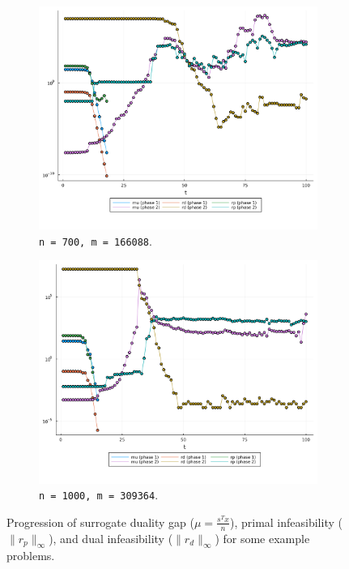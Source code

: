 \documentclass[10pt,a4paper]{article}
\begin{document}
\begin{figure}
\begin{subfigure}[b]{0.49\textwidth}
\includegraphics[width=\textwidth]{plots/ng_700_166088_34_286_70.dimacs.log.png}
\caption{\texttt{n = 700, m = 166088}.}
\end{subfigure}
\hfill
\begin{subfigure}[b]{0.49\textwidth}
\includegraphics[width=\textwidth]{plots/ng_1000_309364_236_231_15.dimacs.log.png}
\caption{\texttt{n = 1000, m = 309364}.}
\end{subfigure}

\caption{Progression of surrogate duality gap ($\mu = \frac{s^Tx}{n}$), primal infeasibility ($\|r_p\|_\infty$), and dual infeasibility ($\|r_d\|_\infty$) for some example problems.}
\end{figure}
\end{document}
